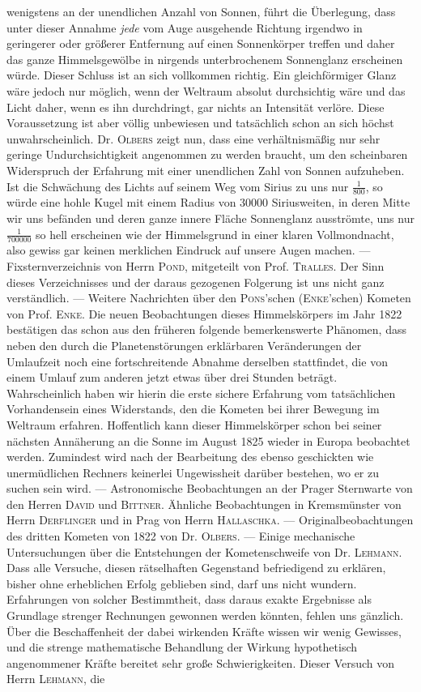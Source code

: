 wenigstens an der unendlichen Anzahl von Sonnen, führt die Überlegung, dass unter dieser Annahme \emph{jede} vom Auge ausgehende Richtung irgendwo in geringerer oder größerer Entfernung auf einen Sonnenkörper treffen und daher das ganze Himmelsgewölbe in nirgends unterbrochenem Sonnenglanz erscheinen würde. Dieser Schluss ist an sich vollkommen richtig. Ein gleichförmiger Glanz wäre jedoch nur möglich, wenn der Weltraum absolut durchsichtig wäre und das Licht daher, wenn es ihn durchdringt, gar nichts an Intensität verlöre. Diese Voraussetzung ist aber völlig unbewiesen und tatsächlich schon an sich höchst unwahrscheinlich. Dr. \textsc{Olbers} zeigt nun, dass eine  verhältnismäßig nur sehr geringe Undurchsichtigkeit angenommen zu werden braucht, um den scheinbaren Widerspruch der Erfahrung mit einer unendlichen Zahl von Sonnen aufzuheben. Ist die Schwächung des Lichts auf seinem Weg vom Sirius zu uns nur $\frac{1}{800}$, so würde eine hohle Kugel mit einem Radius von 30000 Siriusweiten, in deren Mitte wir uns befänden und deren ganze innere Fläche Sonnenglanz ausströmte, uns nur $\frac{1}{700000}$ so hell erscheinen wie der Himmelsgrund in einer klaren Vollmondnacht, also gewiss gar keinen merklichen Eindruck auf unsere Augen machen. --- Fixsternverzeichnis von Herrn \textsc{Pond}, mitgeteilt von Prof. \textsc{Tralles}. Der Sinn dieses Verzeichnisses und der daraus gezogenen Folgerung ist uns nicht ganz verständlich. --- Weitere Nachrichten über den \textsc{Pons}'schen (\textsc{Enke}'schen) Kometen von Prof. \textsc{Enke}. Die neuen Beobachtungen dieses Himmelskörpers im Jahr 1822 bestätigen das schon aus den früheren folgende bemerkenswerte Phänomen, dass neben den durch die Planetenstörungen erklärbaren Veränderungen der Umlaufzeit noch eine fortschreitende Abnahme derselben stattfindet, die von einem Umlauf zum anderen jetzt etwas über drei Stunden beträgt. Wahrscheinlich haben wir hierin die erste sichere Erfahrung vom tatsächlichen Vorhandensein eines Widerstands, den die Kometen bei ihrer Bewegung im Weltraum erfahren. Hoffentlich kann dieser Himmelskörper schon bei seiner nächsten Annäherung an die Sonne im August 1825 wieder in Europa beobachtet werden. Zumindest wird nach der Bearbeitung des ebenso geschickten wie unermüdlichen Rechners keinerlei Ungewissheit darüber bestehen, wo er zu suchen sein wird. --- Astronomische Beobachtungen an der Prager Sternwarte von den Herren \textsc{David} und \textsc{Bittner}. Ähnliche Beobachtungen in Kremsmünster von Herrn \textsc{Derflinger} und in Prag von Herrn \textsc{Hallaschka}. --- Originalbeobachtungen des dritten Kometen von 1822 von Dr. \textsc{Olbers}. --- Einige mechanische Untersuchungen über die Entstehungen der Kometenschweife von Dr. \textsc{Lehmann}. Dass alle Versuche, diesen rätselhaften Gegenstand befriedigend zu erklären, bisher ohne erheblichen Erfolg geblieben sind, darf uns nicht wundern. Erfahrungen von solcher Bestimmtheit, dass daraus exakte Ergebnisse als Grundlage strenger Rechnungen gewonnen werden könnten, fehlen uns gänzlich. Über die Beschaffenheit der dabei wirkenden Kräfte wissen wir wenig Gewisses, und die strenge mathematische Behandlung der Wirkung hypothetisch angenommener Kräfte bereitet sehr große Schwierigkeiten. Dieser Versuch von Herrn \textsc{Lehmann}, die 